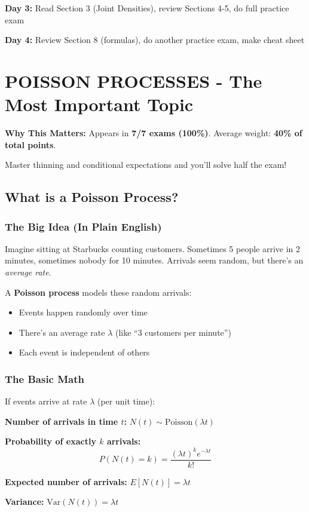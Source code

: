 \documentclass[10pt,letterpaper]{article}
\begin{document}
\textbf{Day 3:} Read Section 3 (Joint Densities), review Sections 4-5, do full practice exam

\textbf{Day 4:} Review Section 8 (formulas), do another practice exam, make cheat sheet

\newpage

\section{POISSON PROCESSES - The Most Important Topic}

\begin{criticalbox}
\textbf{Why This Matters:} Appears in \textbf{7/7 exams (100\%)}. Average weight: \textbf{40\% of total points}.

Master thinning and conditional expectations and you'll solve half the exam!
\end{criticalbox}

\subsection{What is a Poisson Process?}

\subsubsection{The Big Idea (In Plain English)}

Imagine sitting at Starbucks counting customers. Sometimes 5 people arrive in 2 minutes, sometimes nobody for 10 minutes. Arrivals seem random, but there's an \textit{average rate}.

A \textbf{Poisson process} models these random arrivals:
\begin{itemize}
  \item Events happen randomly over time
  \item There's an average rate $\lambda$ (like ``3 customers per minute'')
  \item Each event is independent of others
\end{itemize}

\subsubsection{The Basic Math}

If events arrive at rate $\lambda$ (per unit time):

\begin{formulabox}
\textbf{Number of arrivals in time $t$:} $N(t) \sim \text{Poisson}(\lambda t)$

\vspace{0.2cm}

\textbf{Probability of exactly $k$ arrivals:}
\[
P(N(t) = k) = \frac{(\lambda t)^k e^{-\lambda t}}{k!}
\]

\textbf{Expected number of arrivals:} $E[N(t)] = \lambda t$

\textbf{Variance:} $\text{Var}(N(t)) = \lambda t$
\end{formulabox}
\end{document}
